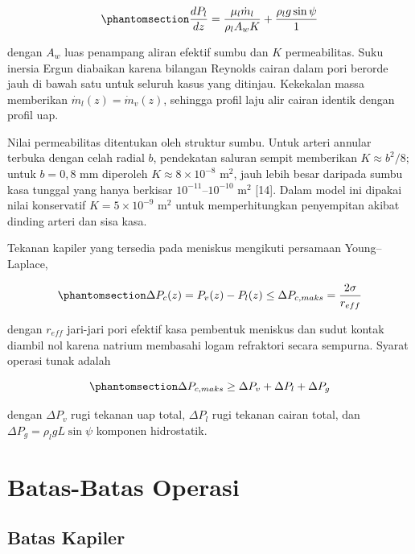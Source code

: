 \documentclass[
  indonesian,
  12pt,
  a4paper,
]{report}
\begin{document}
\begin{equation}\protect\phantomsection\label{eq-darcy}{\frac{dP_l}{dz} = \frac{\mu_l \dot m_l}{\rho_l A_w K} + \frac{\rho_l g \sin\psi}{1}}\end{equation}

dengan \(A_w\) luas penampang aliran efektif sumbu dan \(K\)
permeabilitas. Suku inersia Ergun diabaikan karena bilangan Reynolds
cairan dalam pori berorde jauh di bawah satu untuk seluruh kasus yang
ditinjau. Kekekalan massa memberikan \(\dot m_l(z) = \dot m_v(z)\),
sehingga profil laju alir cairan identik dengan profil uap.

Nilai permeabilitas ditentukan oleh struktur sumbu. Untuk arteri annular
terbuka dengan celah radial \(b\), pendekatan saluran sempit memberikan
\(K \approx b^{2}/8\); untuk \(b = 0{,}8\) mm diperoleh
\(K \approx 8 \times 10^{-8}\) m\(^{2}\), jauh lebih besar daripada
sumbu kasa tunggal yang hanya berkisar \(10^{-11}\)--\(10^{-10}\)
m\(^{2}\) {[}14{]}. Dalam model ini dipakai nilai konservatif
\(K = 5 \times 10^{-9}\) m\(^{2}\) untuk memperhitungkan penyempitan
akibat dinding arteri dan sisa kasa.

Tekanan kapiler yang tersedia pada meniskus mengikuti persamaan
Young--Laplace,

\begin{equation}\protect\phantomsection\label{eq-laplace}{\Delta P_{c}(z) = P_v(z) - P_l(z) \le \Delta P_{c,maks} = \frac{2\sigma}{r_{eff}}}\end{equation}

dengan \(r_{eff}\) jari-jari pori efektif kasa pembentuk meniskus dan
sudut kontak diambil nol karena natrium membasahi logam refraktori
secara sempurna. Syarat operasi tunak adalah

\begin{equation}\protect\phantomsection\label{eq-neraca-tekanan}{\Delta P_{c,maks} \ge \Delta P_v + \Delta P_l + \Delta P_g}\end{equation}

dengan \(\Delta P_v\) rugi tekanan uap total, \(\Delta P_l\) rugi
tekanan cairan total, dan \(\Delta P_g = \rho_l g L \sin\psi\) komponen
hidrostatik.

\section{Batas-Batas Operasi}\label{batas-batas-operasi}

\subsection{Batas Kapiler}\label{batas-kapiler}
\end{document}
